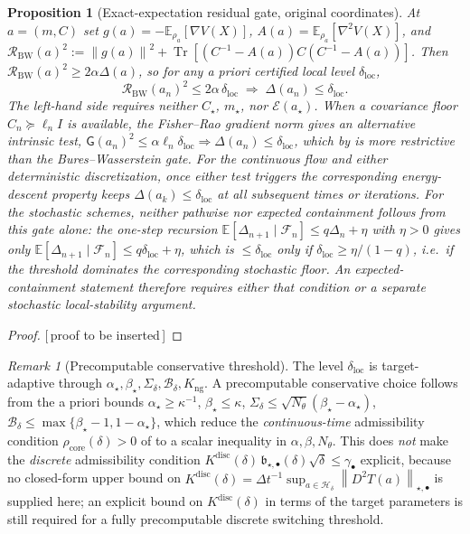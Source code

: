\documentclass[11pt]{article}
\theoremstyle{plain}
\newtheorem{proposition}[proposition]{Proposition}
\theoremstyle{definition}
\theoremstyle{remark}
\newtheorem{remark}[remark]{Remark}
\newcommand{\E}{\mathbb{E}}
\newcommand{\Tr}{\operatorname{Tr}}
\newcommand{\Id}{I}
\newcommand{\calE}{\mathcal{E}}
\newcommand{\Fil}{\mathcal{F}}
\newcommand{\norm}[1]{\left\lVert #1\right\rVert}
\newcommand{\Gradnorm}{\mathsf{G}}
\newcommand{\Hreg}{\mathcal{H}}
\newcommand{\Kng}{K_{\mathrm{ng}}}
\newcommand{\Kdisc}{K^{\mathrm{disc}}}
\newcommand{\PROOFHOLE}{{\color{red}\textsf{[\,proof to be inserted\,]}}}
\begin{document}
\begin{proposition}[Exact-expectation residual gate, original coordinates]
\label{prop:entry-residual}
At $a=(m,C)$ set $g(a)=-\E_{\rho_a}[\nabla V(X)]$, $A(a)=\E_{\rho_a}[\nabla^2V(X)]$, and
$\mathcal R_{\mathrm{BW}}(a)^2:=\norm{g(a)}^2+\Tr[(C^{-1}-A(a))C(C^{-1}-A(a))]$. Then
$\mathcal R_{\mathrm{BW}}(a)^2\geq2\alpha\Delta(a)$, so for any a priori certified local level
$\delta_{\mathrm{loc}}$,
\[
    \mathcal R_{\mathrm{BW}}(a_n)^2\leq2\alpha\,\delta_{\mathrm{loc}}
    \;\Longrightarrow\;
    \Delta(a_n)\leq\delta_{\mathrm{loc}} .
\]
The left-hand side requires neither $C_\star$, $m_\star$, nor $\calE(a_\star)$. When a covariance
floor $C_n\succeq\ell_n\Id$ is available, the Fisher--Rao gradient norm gives an alternative
intrinsic test, $\Gradnorm(a_n)^2\leq\alpha\ell_n\delta_{\mathrm{loc}}\Rightarrow\Delta(a_n)\leq\delta_{\mathrm{loc}}$,
which by  is more restrictive than the Bures--Wasserstein gate. For the continuous
flow and either deterministic discretization, once either test triggers the corresponding
energy-descent property keeps $\Delta(a_k)\leq\delta_{\mathrm{loc}}$ at all subsequent times or
iterations. For the stochastic schemes, neither pathwise nor expected containment follows from this
gate alone: the one-step recursion $\E[\Delta_{n+1}\mid\Fil_n]\leq q\Delta_n+\eta$ with $\eta>0$ gives
only $\E[\Delta_{n+1}\mid\Fil_n]\leq q\delta_{\mathrm{loc}}+\eta$, which is $\leq\delta_{\mathrm{loc}}$
only if $\delta_{\mathrm{loc}}\geq\eta/(1-q)$, i.e.\ if the threshold dominates the corresponding
stochastic floor. An expected-containment statement therefore requires either that condition or a
separate stochastic local-stability argument.
\end{proposition}

\begin{proof}
\PROOFHOLE
\end{proof}

\begin{remark}[Precomputable conservative threshold]
\label{rem:threshold-computable}
The level $\delta_{\mathrm{loc}}$ is target-adaptive through
$\alpha_\star,\beta_\star,\Sigma_\delta,\mathcal B_\delta,\Kng$. A precomputable conservative
choice follows from the a priori bounds $\alpha_\star\geq\kappa^{-1}$, $\beta_\star\leq\kappa$,
$\Sigma_\delta\leq\sqrt{N_\theta}(\beta_\star-\alpha_\star)$,
$\mathcal B_\delta\leq\max\{\beta_\star-1,1-\alpha_\star\}$, which reduce the \emph{continuous-time}
admissibility condition $\rho_{\mathrm{core}}(\delta)>0$ of  to a scalar
inequality in $\alpha,\beta,N_\theta$. This does \emph{not} make the \emph{discrete} admissibility
condition $\Kdisc(\delta)\,\mathfrak b_{\star,\bullet}(\delta)\sqrt\delta\leq\gamma_\bullet$ explicit,
because no closed-form upper bound on $\Kdisc(\delta)=\Delta t^{-1}\sup_{a\in\Hreg_\delta}\norm{D^2T(a)}_{\star,\bullet}$
is supplied here; an explicit bound on $\Kdisc(\delta)$ in terms of the target parameters is still
required for a fully precomputable discrete switching threshold.
\end{remark}
\end{document}
